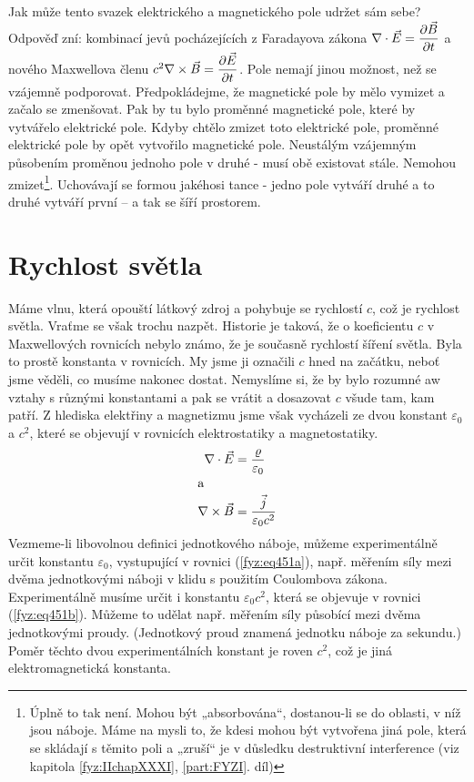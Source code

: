{  Jak může tento svazek elektrického a magnetického pole udržet sám sebe? Odpověď zní: kombinací 
  jevů pocházejících z Faradayova zákona \(\nabla\cdot\vec{E} = \dfrac{\partial \vec{B}}{\partial t}\) a nového 
  Maxwellova členu \(c^2\nabla\times\vec{B} =\dfrac{\partial \vec{E}}{\partial t} \). Pole nemají jinou možnost, než 
  se vzájemně podporovat. Předpokládejme, že magnetické pole by mělo vymizet a začalo se zmenšovat. 
  Pak by tu bylo proměnné magnetické pole, které by vytvářelo elektrické pole. Kdyby chtělo zmizet 
  toto elektrické pole, proměnné elektrické pole by opět vytvořilo magnetické pole. Neustálým 
  vzájemným působením proměnou jednoho pole v druhé - musí obě existovat stále. Nemohou 
  zmizet\footnote{ Úplně to tak není. Mohou být „absorbována“, dostanou-li se do oblasti, v níž 
  jsou náboje. Máme na mysli to, že kdesi mohou být vytvořena jiná pole, která se skládají s těmito 
  poli a „zruší“ je v důsledku destruktivní interference (viz kapitola \ref{fyz:IIchapXXXI}, 
  \ref{part:FYZI}. díl)}. Uchovávají se formou jakéhosi tance - jedno pole vytváří druhé a to druhé 
  vytváří první – a tak se šíří prostorem.

\newpage
\section{Rychlost světla}\label{fyz:IIchapXVIIIsecIV}
  Máme vlnu, která opouští látkový zdroj a pohybuje se rychlostí \(c\), což je rychlost světla. 
  Vraťme se však trochu nazpět. Historie je taková, že o koeficientu \(c\) v Maxwellových rovnicích 
  nebylo známo, že je současně rychlostí šíření světla. Byla to prostě konstanta v rovnicích. My 
  jsme ji označili \(c\) hned na začátku, neboť jsme věděli, co musíme nakonec dostat. Nemyslíme 
  si, že by bylo rozumné aw vztahy s různými konstantami a pak se vrátit a dosazovat \(c\) všude 
  tam, kam patří. Z hlediska elektřiny a magnetizmu jsme však vycházeli ze dvou konstant 
  \(\varepsilon_0\) a \(c^2\), které se objevují v rovnicích elektrostatiky a magnetostatiky.
  \begin{subequations}\label{fyz:eq451}
    \begin{align}
      \nabla\cdot\vec{E}  &= \frac{\varrho}{\varepsilon_0}    \label{fyz:eq451a}\\
      \shortintertext{a} 
      \nabla\times\vec{B} &= \frac{\vec{j}}{\varepsilon_0c^2} \label{fyz:eq451b}
    \end{align}
  \end{subequations}
  Vezmeme-li libovolnou definici jednotkového náboje, můžeme experimentálně určit konstantu 
  \(\varepsilon_0\), vystupující v rovnici (\ref{fyz:eq451a}), např. měřením síly mezi dvěma 
  jednotkovými náboji v klidu s použitím Coulombova zákona. Experimentálně musíme určit i konstantu 
  \(\varepsilon_0c^2\), která se objevuje v rovnici (\ref{fyz:eq451b}). Můžeme to udělat např. 
  měřením síly působící mezi dvěma jednotkovými proudy. (Jednotkový proud znamená jednotku náboje 
  za sekundu.) Poměr těchto dvou experimentálních konstant je roven \(c^2\), což je jiná 
  elektromagnetická konstanta. 
 
}
